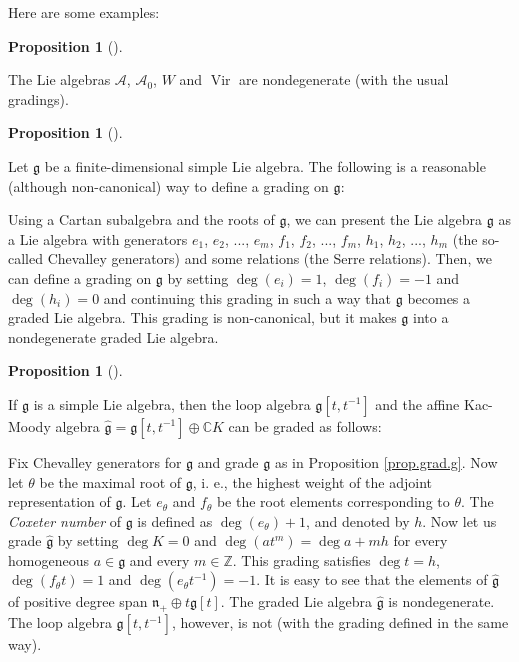 \documentclass
[numbers=enddot,12pt,final,onecolumn,german,notitlepage]{scrartcl}%
\theoremstyle{definition}
\newtheorem{prop}[theo]{Proposition}
\newenvironment{proposition}[1][]
{\begin{prop}[#1]\begin{leftbar}}
{\end{leftbar}\end{prop}}
\begin{document}
Here are some examples:

\begin{proposition}
The Lie algebras $\mathcal{A}$, $\mathcal{A}_{0}$, $W$ and
$\operatorname*{Vir}$ are nondegenerate (with the usual gradings).
\end{proposition}

\begin{proposition}
\label{prop.grad.g}Let $\mathfrak{g}$ be a finite-dimensional simple Lie
algebra. The following is a reasonable (although non-canonical) way to define
a grading on $\mathfrak{g}$:

Using a Cartan subalgebra and the roots of $\mathfrak{g}$, we can present the
Lie algebra $\mathfrak{g}$ as a Lie algebra with generators $e_{1}$, $e_{2}$,
$...$, $e_{m}$, $f_{1}$, $f_{2}$, $...$, $f_{m}$, $h_{1}$, $h_{2}$, $...$,
$h_{m}$ (the so-called Chevalley generators) and some relations (the Serre
relations). Then, we can define a grading on $\mathfrak{g}$ by setting
$\deg\left(  e_{i}\right)  =1$, $\deg\left(  f_{i}\right)  =-1$ and
$\deg\left(  h_{i}\right)  =0$ and continuing this grading in such a way that
$\mathfrak{g}$ becomes a graded Lie algebra. This grading is non-canonical,
but it makes $\mathfrak{g}$ into a nondegenerate graded Lie algebra.
\end{proposition}

\begin{proposition}
If $\mathfrak{g}$ is a simple Lie algebra, then the loop algebra
$\mathfrak{g}\left[  t,t^{-1}\right]  $ and the affine Kac-Moody algebra
$\widehat{\mathfrak{g}}=\mathfrak{g}\left[  t,t^{-1}\right]  \oplus
\mathbb{C}K$ can be graded as follows:

Fix Chevalley generators for $\mathfrak{g}$ and grade $\mathfrak{g}$ as in
Proposition \ref{prop.grad.g}. Now let $\theta$ be the maximal root of
$\mathfrak{g}$, i. e., the highest weight of the adjoint representation of
$\mathfrak{g}$. Let $e_{\theta}$ and $f_{\theta}$ be the root elements
corresponding to $\theta$. The \textit{Coxeter number} of $\mathfrak{g}$ is
defined as $\deg\left(  e_{\theta}\right)  +1$, and denoted by $h$. Now let us
grade $\widehat{\mathfrak{g}}$ by setting $\deg K=0$ and $\deg\left(
at^{m}\right)  =\deg a+mh$ for every homogeneous $a\in\mathfrak{g}$ and every
$m\in\mathbb{Z}$. This grading satisfies $\deg t=h$, $\deg\left(  f_{\theta
}t\right)  =1$ and $\deg\left(  e_{\theta}t^{-1}\right)  =-1$. It is easy to
see that the elements of $\widehat{\mathfrak{g}}$ of positive degree span
$\mathfrak{n}_{+}\oplus t\mathfrak{g}\left[  t\right]  $. The graded Lie
algebra $\widehat{\mathfrak{g}}$ is nondegenerate. The loop algebra
$\mathfrak{g}\left[  t,t^{-1}\right]  $, however, is not (with the grading
defined in the same way).
\end{proposition}
\end{document}
